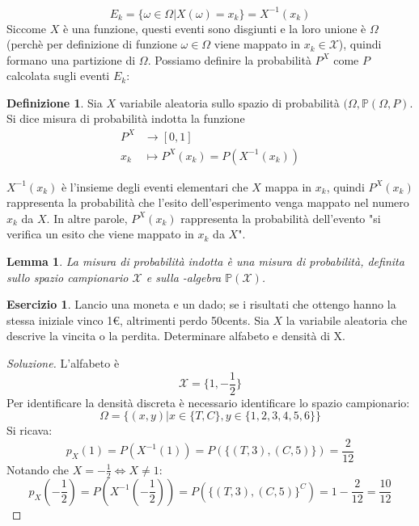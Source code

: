\documentclass{article}
\theoremstyle{plain}
\newtheorem{lemma}{Lemma}[section]
\theoremstyle{definition}
\newtheorem{definizione}{Definizione}[section]
\newtheorem{esercizio}{Esercizio}[section]
\theoremstyle{remark}
\newenvironment{soluzione}
	{\renewcommand\qedsymbol{$\mathwitch*$}\begin{proof}[Soluzione]}
	{\end{proof}}
\renewcommand{\qedsymbol}{$\mathrightghost$}
\newcommand{\uline}[1]{%
  \ul{{\phantom{#1}}}%
  \llap{\contour{white}{#1}}%
}
\begin{document}
\begin{equation*}
	E_k=\{\omega\in\Omega|X(\omega)=x_k\}=X^{-1}(x_k)
\end{equation*}
Siccome $X$ è una funzione, questi eventi sono disgiunti e la loro unione è $\Omega$ (perchè per definizione di funzione \uline{ogni} $\omega\in\Omega$ viene mappato in \uline{uno e un solo} $x_k\in\mathcal{X}$), quindi formano una partizione di $\Omega$. Possiamo definire la probabilità $P^X$ come $P$ calcolata sugli eventi $E_k$:
\begin{definizione}
	Sia $X$ variabile aleatoria sullo spazio di probabilità $(\Omega,\mathds{P}(\Omega,P)$. Si dice misura di probabilità indotta la funzione
	\begin{align*}
		P^X&\to [0,1]\\
		x_k&\mapsto P^X(x_k)=P(X^{-1}(x_k))
	\end{align*}
\end{definizione}
$X^{-1}(x_k)$ è l'insieme degli eventi elementari che $X$ mappa in $x_k$, quindi $P^X(x_k)$ rappresenta la probabilità che l'esito dell'esperimento venga mappato nel numero $x_k$ da $X$. In altre parole, $P^X(x_k)$ rappresenta la probabilità dell'evento "si verifica un esito che viene mappato in $x_k$ da $X$".
\begin{lemma}
	La misura di probabilità indotta è una misura di probabilità, definita sullo spazio campionario $\mathcal{X}$ e sulla \sigma-algebra $\mathds{P}(\mathcal{X})$.
\end{lemma}
\begin{esercizio}
	Lancio una moneta e un dado; se i risultati che ottengo hanno la stessa iniziale vinco 1€, altrimenti perdo 50cents. Sia $X$ la variabile aleatoria che descrive la vincita o la perdita. Determinare alfabeto e densità di X.
	\begin{soluzione}
		L'alfabeto è
		\begin{equation*}
			\mathcal{X}=\{1,-\frac{1}{2}\}
		\end{equation*}
		Per identificare la densità discreta è necessario identificare lo spazio campionario:
		\begin{equation*}
			\Omega=\{(x,y)|x\in\{T,C\}, y\in\{1,2,3,4,5,6\}\}
		\end{equation*}
		Si ricava:
		\begin{equation*}
			p_X(1)=P(X^{-1}(1))=P(\{(T,3),(C,5)\})=\frac{2}{12}
		\end{equation*}
		Notando che $X=-\frac{1}{2}\Leftrightarrow X\neq 1$:
		\begin{equation*}
			p_X(-\frac{1}{2})=P(X^{-1}(-\frac{1}{2}))=P(\{(T,3),(C,5)\}^C)=1-\frac{2}{12}=\frac{10}{12}
		\end{equation*}
	\end{soluzione}
\end{esercizio}
\end{document}
